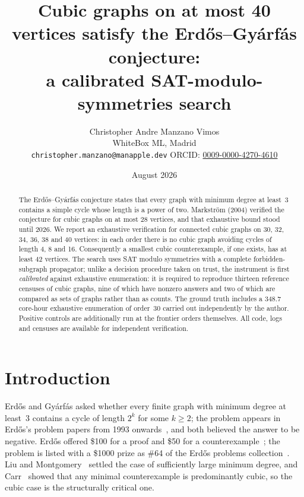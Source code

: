 \documentclass[11pt]{article}
\title{Cubic graphs on at most 40 vertices satisfy the
  Erd\H{o}s--Gy\'arf\'as conjecture:\\
  a calibrated SAT-modulo-symmetries search}
\author{Christopher Andre Manzano Vimos\\
  \small WhiteBox ML, Madrid\\
  \small \texttt{christopher.manzano@manapple.dev} \quad
  ORCID: \href{https://orcid.org/0009-0000-4270-4610}{0009-0000-4270-4610}}
\date{August 2026}
\begin{document}
\maketitle

\begin{abstract}
The Erd\H{o}s--Gy\'arf\'as conjecture states that every graph with minimum
degree at least~3 contains a simple cycle whose length is a power of two.
Markstr\"om (2004) verified the conjecture for cubic graphs on at most 28
vertices, and that exhaustive bound stood until 2026. We report an exhaustive
verification for connected cubic graphs on 30, 32, 34, 36, 38 and 40 vertices:
in each
order there is no cubic graph avoiding cycles of length 4, 8 and 16.
Consequently a smallest cubic counterexample, if one exists, has at least 42
vertices. The search uses SAT modulo symmetries with a complete
forbidden-subgraph propagator; unlike a decision procedure taken on trust, the
instrument is first \emph{calibrated} against exhaustive enumeration: it is
required to reproduce thirteen reference censuses of cubic graphs, nine of
which have nonzero answers and two of which are compared as sets of graphs
rather than as counts. The ground truth includes a 348.7 core-hour exhaustive
enumeration of order~30 carried out independently by the author. Positive
controls are additionally run at the frontier orders themselves. All code,
logs and censuses are available for independent verification.
\end{abstract}

\section{Introduction}

Erd\H{o}s and Gy\'arf\'as asked whether every finite graph with minimum degree
at least~3 contains a cycle of length $2^k$ for some $k\ge 2$; the problem
appears in Erd\H{o}s's problem papers from 1993 onwards~\cite{erdos93}, and
both believed the answer to be negative. Erd\H{o}s offered \$100 for a proof
and \$50 for a counterexample~\cite{markstrom2004}; the problem is listed with
a \$1000 prize as \#64 of the Erd\H{o}s problems
collection~\cite{erdosproblems}. Liu and Montgomery~\cite{liumontgomery}
settled the case of sufficiently large minimum degree, and
Carr~\cite{carr2026} showed that any minimal counterexample is predominantly
cubic, so the cubic case is the structurally critical one.
\end{document}
